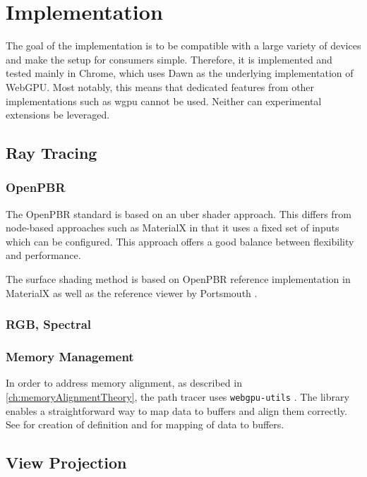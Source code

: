 \section{Implementation}

The goal of the implementation is to be compatible with a large variety of devices and make the setup for consumers simple. Therefore, it is implemented and tested mainly in Chrome, which uses \gls{Dawn} as the underlying implementation of WebGPU. Most notably, this means that dedicated features from other implementations such as \gls{wgpu} cannot be used. Neither can experimental extensions be leveraged.

\subsection{Ray Tracing}

\subsubsection{OpenPBR}

The \gls{OpenPBR} standard is based on an \gls{uber shader} approach. This differs from node-based approaches such as \gls{MaterialX} in that it uses a fixed set of inputs which can be configured. This approach offers a good balance between flexibility and performance.

The surface shading method is based on \gls{OpenPBR} reference implementation in \gls{MaterialX} as well as the reference viewer by Portsmouth \cite{openPbrViewer}.

\subsubsection{RGB, Spectral}
\subsubsection{Memory Management}

In order to address memory alignment, as described in \autoref{ch:memoryAlignmentTheory}, the path tracer uses \texttt{webgpu-utils} \cite{webgpuUtilsLib}. The library enables a straightforward way to map data to buffers and align them correctly. See  for creation of definition and  for mapping of data to buffers.


\subsection{View Projection}

